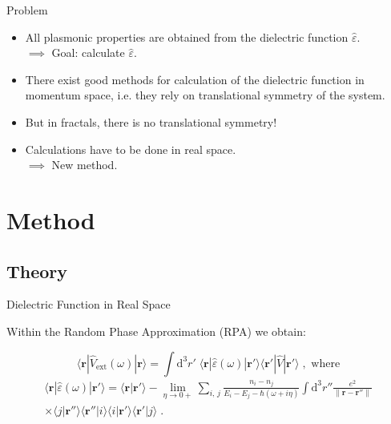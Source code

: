 \documentclass{beamer}
\begin{document}
\begin{frame}{Problem}
    \begin{itemize}
    \item All plasmonic properties are obtained from the \alert{dielectric function} $\hat\varepsilon$. \\
        $\implies$ Goal: \alert{calculate $\hat\varepsilon$}.
    \item There exist good methods for calculation of the dielectric function in \alert{momentum space}, i.e. they rely on translational symmetry of the system.
    \item But in fractals, there is \alert{no translational symmetry}!
    \item Calculations have to be done in \alert{real space}. \\
        $\implies$ \alert{New method}.
    \end{itemize}
\end{frame}

\section{Method}

\subsection{Theory}

\begin{frame}{Dielectric Function in Real Space}

    Within the Random Phase Approximation (RPA) we obtain:

    \[ \langle \mathbf{r} | \hat V_\text{ext}(\omega) | \mathbf{r} \rangle = \int\!\! \text{d}^3 r' \; \langle \mathbf{r} | \hat \varepsilon(\omega) | \mathbf{r'} \rangle \langle \mathbf{r'} | \hat V | \mathbf{r'} \rangle \; , \text{ where} 
    \]
    \begin{multline*}
        \langle \mathbf{r} | \hat \varepsilon(\omega) | \mathbf{r'} \rangle 
            = \langle \mathbf{r} | \mathbf{r'} \rangle - \lim_{\eta \to 0+} \sum_{i,\,j} \frac{n_i - n_j}{E_i \!-\! E_j - \hbar(\omega \!+\! i\eta)} \int\!\! \text{d}^3 r'' \frac{e^2}{\| \mathbf{r} - \mathbf{r''} \|} \\
        \times \langle j |\mathbf{r''}\rangle \langle\mathbf{r''} | i \rangle \langle i | \mathbf{r'}\rangle \langle \mathbf{r'} | j \rangle \;.
    \end{multline*}
\end{frame}
\end{document}
